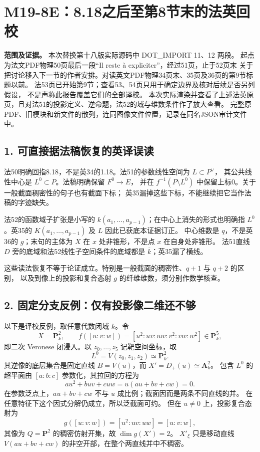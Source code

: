 \documentclass[UTF8,a4paper]{ctexbook}
\begin{document}
\section*{M19-8E：8.18之后至第8节末的法英回校}

\noindent\textbf{范围及证据。}
本次替换第十八版实际源码中 DOT\_IMPORT 11、12 两段。
起点为法文PDF物理50页最后一段“Il reste à expliciter”，经过51页，止于52页末
关于把讨论移入下一节的作者安排。对读英文PDF物理34页末、35页及36页的第9节标题以前。
法53页已开始第9节；查看53、54页只用于确定边界及核对后续是否另列假设，
不是声称此报告覆盖它们的全部译校。
本次实际渲染并查看了上述法英原页，且对法51的投影定义、逆命题，法52的域与维数条件作了放大查看。
完整原PDF、旧模块和新文件的散列，连同图像文件位置，记录在同名JSON审计文件中。

\subsection*{1. 可直接据法稿恢复的英译误读}

法50明确回指8.18，不是英34的1.18。法51的参数线性空间为 $L\subset P^\vee$，
其公共线性中心是 $L^0\subset P$。法稿明确保留 $F^0\to E$，
并在 $f^{-1}(P\setminus L^0)$ 中保留上标0。关于一般截面稠密性的句子也有截面下标；
英35漏掉这些下标，不能继续把它当作法稿的字迹缺失。

法52的函数域子扩张是小写的 $k(a_1,\ldots,a_{p-1})$；在中心上消失的形式也明确指
$L^0$。英35的 $K(a_1,\ldots,a_{p-1})$ 及 $L$ 因此已获底本证据订正。
中心维数是 $q$，不是英36的 $g$；末句的主体为 $X$ 在 $x$ 处非锥形，不是点 $x$ 在自身处非锥形。
法51直线 $D$ 旁的底域和法52线性子空间条件的底域都是 $\overline k$；英35漏了横线。

这些读法恢复不等于论证成立。特别是一般截面的稠密性、$q+1$ 与 $q+2$ 的区别，
以及到像上的投影和复合态射 $g$ 的纤维维数，须分别作数学核查。

\subsection*{2. 固定分支反例：仅有投影像二维还不够}

以下是译校反例，取任意代数闭域 $k$。令
\[
 X=\mathbf P^2_k,\qquad
 f([u:v:w])=[u^2:uv:uw:v^2:vw:w^2]\in\mathbf P^5_k,
\]
即二次 Veronese 闭浸入。以 $z_0,\ldots,z_5$ 记靶空间坐标，取
\[
 L^0=V(z_0,z_1,z_2)\simeq\mathbf P^2_k.
\]
其逆像的底层集合是固定直线 $B=V(u)$，而 $X'=D_+(u)\simeq\mathbf A^2_k$。
包含 $L^0$ 的超平面由 $[a:b:c]$ 参数化，其拉回的方程为
\[
 a u^2+buv+cuw=u(au+bv+cw)=0.
\]
在参数泛点上，$au+bv+cw$ 不与 $u$ 成比例；截面因而是两条不同直线的并。
在任意特征下这个因式分解仍成立，所以泛截面可约。
但在 $u\ne0$ 上，投影复合态射为
\[
 g([u:v:w])=[u^2:uv:uw]=[u:v:w],
\]
其像为 $Q=\mathbf P^2$ 的稠密仿射开集，故 $\dim g(X')=2$。
$X'_\xi$ 只是移动直线 $V(au+bv+cw)$ 的非空开部，在整个两直线并中不稠密。
\end{document}
